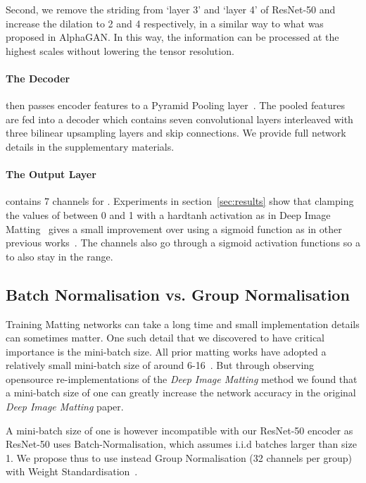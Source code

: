 \documentclass[runningheads]{llncs}
\begin{document}
Second, we remove the striding from `layer 3' and `layer 4' of ResNet-50 and
increase the dilation to 2 and 4 respectively, in a similar way to what was
proposed in AlphaGAN. In this way, the information can be processed at the
highest scales without lowering the tensor resolution.

\paragraph{The Decoder} then passes encoder features to a Pyramid Pooling
layer~\cite{PSPNet}. The pooled features are fed into a decoder which contains
seven convolutional layers interleaved with three bilinear upsampling layers and
skip connections. We provide full network details in the supplementary materials.

\paragraph{The Output Layer} contains 7 channels for . 
Experiments in section~\ref{sec:results} show that clamping the values of 
between 0 and 1 with a hardtanh activation as in Deep Image Matting~\cite{DeepImageMatting} gives a small improvement over using
a sigmoid function as in other previous works~\cite{VDRNMatting,GCAMatting,LearningBasedSamplingMatting,AlphaGAN,ContextMatting,DisentangledMatting}. The  channels also go through
a sigmoid activation functions so a to also stay in the  range.


\subsection{Batch Normalisation vs. Group Normalisation}

Training Matting networks can take a long time and small implementation details
can sometimes matter. One such detail that we discovered to have critical
importance is the mini-batch size. All prior matting works have adopted a
relatively small mini-batch size of around 6-16~\cite{ContextMatting,GCAMatting}. But through observing opensource re-implementations\cite{pytorchDIM} of the \textit{Deep Image Matting} method we found that a mini-batch size of one can greatly increase the network
accuracy in the original \textit{Deep Image Matting} \cite{DeepImageMatting}
paper.

A mini-batch size of one is however incompatible with our ResNet-50 encoder as
ResNet-50 uses Batch-Normalisation, which assumes i.i.d batches larger than size
1. We propose thus to use instead Group Normalisation (32 channels per group)
with Weight Standardisation~\cite{groupnorm,weightstandardization}.
\end{document}
